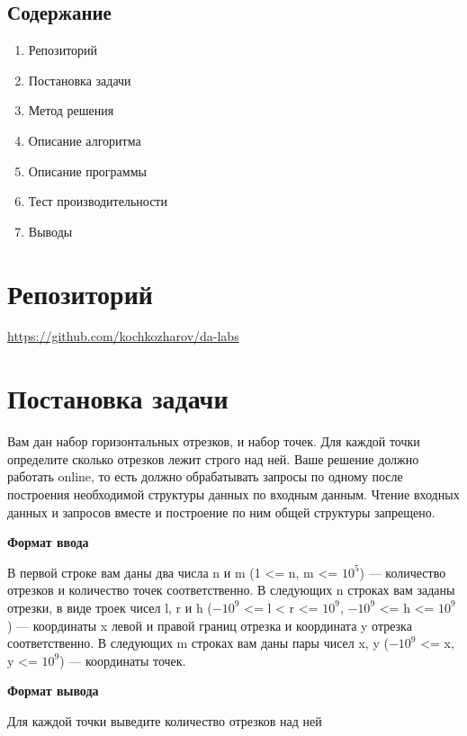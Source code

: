 \documentclass[12pt]{article}
\begin{document}
\begin{center}
\section*{Содержание}   
\end{center}
\vspace{5ex}
\begin{enumerate}
  \item Репозиторий
  \item Постановка задачи
  \item Метод решения
  \item Описание алгоритма
  \item Описание программы
  \item Тест производительности
  \item Выводы
\end{enumerate}
\newpage


\section*{Репозиторий}   
\vspace{2ex}
\url{https://github.com/kochkozharov/da-labs}

\section*{Постановка задачи}

Вам дан набор горизонтальных отрезков, и набор точек. Для каждой точки определите сколько отрезков лежит строго над ней.  Ваше решение должно работать online, то есть должно обрабатывать запросы по одному после построения необходимой структуры данных по входным данным. Чтение входных данных и запросов вместе и построение по ним общей структуры запрещено. 

\textbf{Формат ввода}

В первой строке вам даны два числа n и m (1 <= n, m <= $10^{5}$) — количество отрезков и количество точек соответственно. В следующих n строках вам заданы отрезки, в виде троек чисел l, r и h ($-10^{9}$ <= l < r <= $10^{9}$, $-10^{9}$ <= h <= $10^{9}$) — координаты x левой и правой границ отрезка и координата y отрезка соответственно. В следующих m строках вам даны пары чисел x, y ($-10^{9}$ <= x, y <= $10^{9}$) — координаты точек. 

\textbf{Формат вывода}

Для каждой точки выведите количество отрезков над ней
\end{document}
